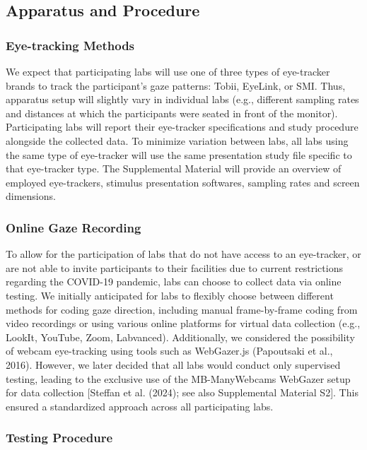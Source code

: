 \documentclass[
  man,floatsintext]{apa6}
\begin{document}
\subsection{Apparatus and Procedure}\label{apparatus-and-procedure}

\subsubsection{Eye-tracking Methods}\label{eye-tracking-methods}

We expect that participating labs will use one of three types of eye-tracker brands to track the participant's gaze patterns: Tobii, EyeLink, or SMI. Thus, apparatus setup will slightly vary in individual labs (e.g., different sampling rates and distances at which the participants were seated in front of the monitor). Participating labs will report their eye-tracker specifications and study procedure alongside the collected data. To minimize variation between labs, all labs using the same type of eye-tracker will use the same presentation study file specific to that eye-tracker type. The Supplemental Material will provide an overview of employed eye-trackers, stimulus presentation softwares, sampling rates and screen dimensions.

\subsubsection{Online Gaze Recording}\label{online-gaze-recording}

To allow for the participation of labs that do not have access to an eye-tracker, or are not able to invite participants to their facilities due to current restrictions regarding the COVID-19 pandemic, labs can choose to collect data via online testing. We initially anticipated for labs to flexibly choose between different methods for coding gaze direction, including manual frame-by-frame coding from video recordings or using various online platforms for virtual data collection (e.g., LookIt, YouTube, Zoom, Labvanced). Additionally, we considered the possibility of webcam eye-tracking using tools such as WebGazer.js (Papoutsaki et al., 2016). However, we later decided that all labs would conduct only supervised testing, leading to the exclusive use of the MB-ManyWebcams WebGazer setup for data collection {[}Steffan et al. (2024); see also Supplemental Material S2{]}. This ensured a standardized approach across all participating labs.

\subsubsection{Testing Procedure}\label{testing-procedure}
\end{document}
